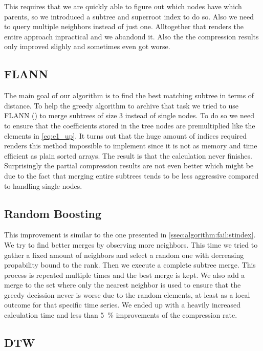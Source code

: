 This requires that we are quickly able to figure out which nodes have which parents, so we introduced a subtree and superroot index to do so. Also we need to query multiple neighbors instead of just one. Alltogether that renders the entire approach inpractical and we abandond it. Also the the compression results only improved slighly and sometimes even got worse.


\subsection{FLANN}
\label{ssec:algorithm:fail:flann}

The main goal of our algorithm is to find the best matching subtree in terms of distance. To help the greedy algorithm to archive that task we tried to use FLANN (\cite{FLANN}) to merge subtrees of size \num{3} instead of single nodes. To do so we need to ensure that the coefficients stored in the tree nodes are premultiplied like the elements in \autoref{eq:e1_up}. It turns out that the huge amount of indices required renders this method impossible to implement since it is not as memory and time efficient as plain sorted arrays. The result is that the calculation never finishes. Surprisingly the partial compression results are not even better which might be due to the fact that merging entire subtrees tends to be less aggressive compared to handling single nodes.


\subsection{Random Boosting}
\label{ssec:algorithm:fail:random}

This improvement is similar to the one presented in \autoref{ssec:algorithm:fail:stindex}. We try to find better merges by observing more neighbors. This time we tried to gather a fixed amount of neighbors and select a random one with decreasing propability bound to the rank. Then we execute a complete subtree merge. This process is repeated multiple times and the best merge is kept. We also add a merge to the set where only the nearest neighbor is used to ensure that the greedy decission never is worse due to the random elements, at least as a local outcome for that specific time series. We ended up with a heavily increased calculation time and less than \SI{5}{\percent} improvements of the compression rate.


\subsection{DTW}
\label{ssec:algorithm:fail:dtw}

